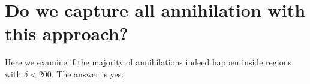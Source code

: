 \appendix

\section{Do we capture all annihilation with this approach?}

Here we examine if the majority of annihilations indeed happen inside regions with $\delta \lt 200$. The answer is yes.